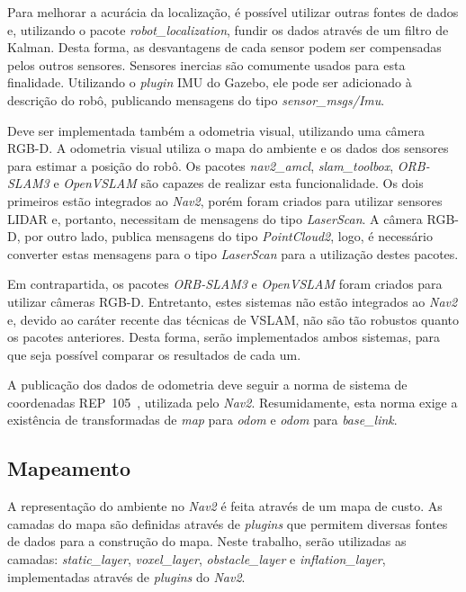 \documentclass[repeatfields,xlists,xpacks,oneside,yearsonly]{ufrgscca}
\begin{document}
Para melhorar a acurácia da localização, é possível utilizar outras fontes de
dados e, utilizando o pacote \textit{robot\_localization}, fundir os dados
através de um filtro de Kalman.
Desta forma, as desvantagens de cada sensor podem ser compensadas pelos outros
sensores.
Sensores inercias são comumente usados para esta finalidade.
Utilizando o \textit{plugin} IMU do Gazebo, ele pode ser adicionado à descrição
do robô, publicando mensagens do tipo \textit{sensor\_msgs/Imu}.


Deve ser implementada também a odometria visual, utilizando uma câmera RGB-D.
A odometria visual utiliza o mapa do ambiente e os dados dos sensores para estimar
a posição do robô.
Os pacotes \textit{nav2\_amcl}, \textit{slam\_toolbox}, \textit{ORB-SLAM3}
e \textit{OpenVSLAM} são capazes de realizar esta funcionalidade.
Os dois primeiros estão integrados ao \textit{Nav2},
porém foram criados para utilizar sensores LIDAR e, portanto,
necessitam de mensagens do tipo \textit{LaserScan}.
A câmera RGB-D, por outro lado, publica mensagens do tipo \textit{PointCloud2},
logo, é necessário converter estas mensagens para o tipo \textit{LaserScan}
para a utilização destes pacotes.

Em contrapartida, os pacotes \textit{ORB-SLAM3} e \textit{OpenVSLAM} foram
criados para utilizar câmeras RGB-D. Entretanto, estes sistemas não estão
integrados ao \textit{Nav2} e, devido ao caráter recente das técnicas de
VSLAM, não são tão robustos quanto os pacotes anteriores.
Desta forma, serão implementados ambos sistemas, para que seja possível
comparar os resultados de cada um.

A publicação dos dados de odometria deve seguir a norma de sistema de coordenadas
REP~105~\cite{rep_105}, utilizada pelo \textit{Nav2}.
Resumidamente, esta norma exige a existência de transformadas de \textit{map}
para \textit{odom} e \textit{odom} para \textit{base\_link}.

\subsection{Mapeamento}

A representação do ambiente no \textit{Nav2} é feita através de um mapa de custo.
As camadas do mapa são definidas através de \textit{plugins} que permitem
diversas fontes de dados para a construção do mapa.
Neste trabalho, serão utilizadas as camadas: \textit{static\_layer},
\textit{voxel\_layer}, \textit{obstacle\_layer} e \textit{inflation\_layer},
implementadas através de \textit{plugins} do \textit{Nav2}.
\end{document}

